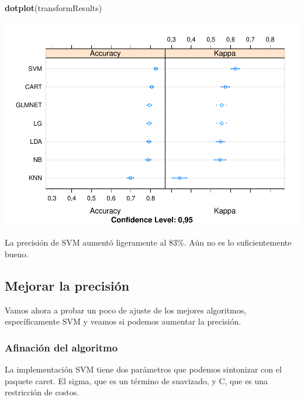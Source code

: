 \documentclass[]{article}
\newenvironment{Shaded}{\begin{snugshade}}{\end{snugshade}}
\newcommand{\KeywordTok}[1]{\textcolor[rgb]{0.13,0.29,0.53}{\textbf{#1}}}
\newcommand{\NormalTok}[1]{#1}
\begin{document}
\begin{Shaded}
\begin{Highlighting}[]
\KeywordTok{dotplot}\NormalTok{(transformResults)}
\end{Highlighting}
\end{Shaded}

\includegraphics{titanicDataClean_files/figure-latex/datasetTrain_evaluate_plot-1.pdf}

La precisión de SVM aumentó ligeramente al 83\%. Aún no es lo
suficientemente bueno.

\subsection{Mejorar la precisión}\label{mejorar-la-precision}

Vamos ahora a probar un poco de ajuste de los mejores algoritmos,
específicamente SVM y veamos si podemos aumentar la precisión.

\subsubsection{Afinación del algoritmo}\label{afinacion-del-algoritmo}

La implementación SVM tiene dos parámetros que podemos sintonizar con el
paquete caret. El sigma, que es un término de suavizado, y C, que es una
restricción de costos.
\end{document}
